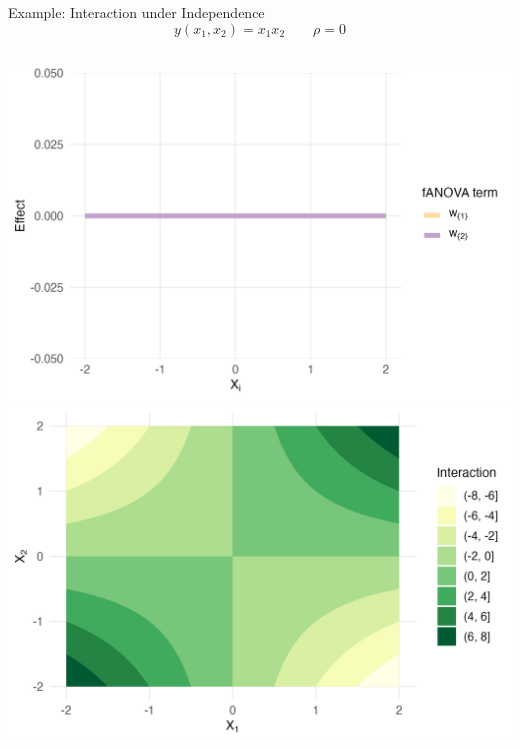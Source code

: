 \begin{frame}{Example: Interaction under Independence}
  \[
  y(x_1, x_2) = x_1 x_2 \qquad \rho = 0
  \]
    \begin{columns}
      \includegraphics[width=\linewidth]{../images/experiment_section/interaction_a1p00_a2p00_a11p00_a22p00_a12p20_rhop00_main.png}
      \includegraphics[width=\linewidth]{../images/experiment_section/interaction_a1p00_a2p00_a11p00_a22p00_a12p20_rhop00_interaction.png}
  \end{columns}
  
\end{frame}



